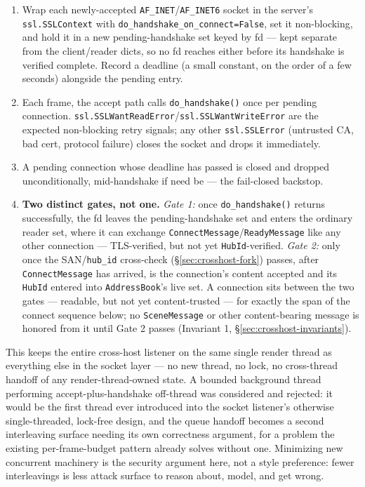\documentclass[a4paper,10pt]{article}
\newcommand{\msg}[1]{\texttt{#1}}
\newcommand{\field}[1]{\texttt{#1}}
\begin{document}
\begin{enumerate}
  \item Wrap each newly-accepted \field{AF\_INET}/\field{AF\_INET6} socket
    in the server's \field{ssl.SSLContext} with
    \field{do\_handshake\_on\_connect=False}, set it non-blocking, and
    hold it in a new pending-handshake set keyed by fd --- kept separate
    from the client/reader dicts, so no fd reaches either before its
    handshake is verified complete.  Record a deadline (a small constant,
    on the order of a few seconds) alongside the pending entry.
  \item Each frame, the accept path calls \field{do\_handshake()} once per
    pending connection.  \field{ssl.SSLWantReadError}/\field{ssl.SSLWantWriteError}
    are the expected non-blocking retry signals; any other
    \field{ssl.SSLError} (untrusted CA, bad cert, protocol failure) closes
    the socket and drops it immediately.
  \item A pending connection whose deadline has passed is closed and
    dropped unconditionally, mid-handshake if need be --- the fail-closed
    backstop.
  \item \textbf{Two distinct gates, not one.}  \emph{Gate 1:} once
    \field{do\_handshake()} returns successfully, the fd leaves the
    pending-handshake set and enters the ordinary reader set, where it can
    exchange \msg{ConnectMessage}/\msg{ReadyMessage} like any other
    connection --- TLS-verified, but not yet \texttt{HubId}-verified.
    \emph{Gate 2:} only once the SAN/\field{hub\_id} cross-check
    (\S\ref{sec:crosshost-fork}) passes, after \msg{ConnectMessage} has
    arrived, is the connection's content accepted and its \texttt{HubId}
    entered into \texttt{AddressBook}'s live set.  A connection sits
    between the two gates --- readable, but not yet content-trusted --- for
    exactly the span of the connect sequence below; no
    \msg{SceneMessage} or other content-bearing message is honored from it
    until Gate 2 passes (Invariant 1, \S\ref{sec:crosshost-invariants}).
\end{enumerate}

This keeps the entire cross-host listener on the same single render thread
as everything else in the socket layer --- no new thread, no lock, no
cross-thread handoff of any render-thread-owned state.  A bounded
background thread performing accept-plus-handshake off-thread was
considered and rejected: it would be the first thread ever introduced into
the socket listener's otherwise single-threaded, lock-free design, and the
queue handoff becomes a second interleaving surface needing its own
correctness argument, for a problem the existing per-frame-budget pattern
already solves without one.  Minimizing new concurrent machinery is the
security argument here, not a style preference: fewer interleavings is
less attack surface to reason about, model, and get wrong.
\end{document}

